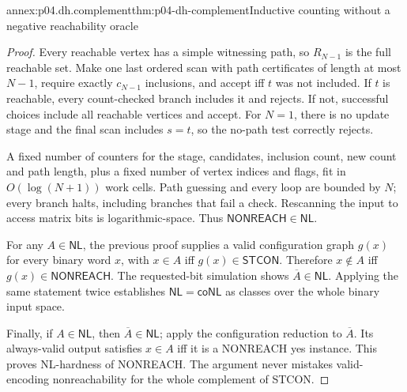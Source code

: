 \begin{annexitem}{annex:p04.dh.complement}{thm:p04-dh-complement}{Inductive counting without a negative reachability oracle}
\begin{proof}
Every reachable vertex has a simple witnessing path, so
\(R_{N-1}\) is the full reachable set. Make one last ordered scan with
path certificates of length at most \(N-1\), require exactly \(c_{N-1}\)
inclusions, and accept iff \(t\) was not included. If \(t\) is reachable,
every count-checked branch includes it and rejects. If not, successful
choices include all reachable vertices and accept. For \(N=1\), there
is no update stage and the final scan includes \(s=t\), so the no-path
test correctly rejects.

A fixed number of counters for the stage, candidates, inclusion count,
new count and path length, plus a fixed number of vertex indices and
flags, fit in \(O(\log(N+1))\) work cells. Path guessing and every loop
are bounded by \(N\); every branch halts, including branches that fail
a check. Rescanning the input to access matrix bits is logarithmic-space.
Thus \(\mathsf{NONREACH}\in\mathsf{NL}\).

For any \(A\in\mathsf{NL}\), the previous proof supplies a valid
configuration graph \(g(x)\) for every binary word \(x\), with
\(x\in A\) iff \(g(x)\in\mathsf{STCON}\). Therefore
\(x\notin A\) iff \(g(x)\in\mathsf{NONREACH}\).
The requested-bit simulation shows \(\overline A\in\mathsf{NL}\).
Applying the same statement twice establishes
\(\mathsf{NL}=\mathsf{coNL}\) as classes over the whole binary input space.

Finally, if \(A\in\mathsf{NL}\), then \(\overline A\in\mathsf{NL}\);
apply the configuration reduction to \(\overline A\).
Its always-valid output satisfies \(x\in A\) iff it is a NONREACH yes
instance. This proves NL-hardness of NONREACH. The argument never
mistakes valid-encoding nonreachability for the whole complement of STCON.
\end{proof}
\end{annexitem}

